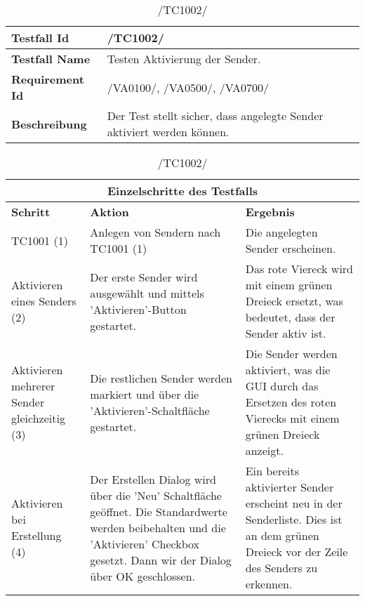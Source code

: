\begin{table}[h]
\caption{/TC1002/}
\label{tab:TC1002}
\begin{center}
\begin{tabular}{|p{3.5cm}|p{9cm}|}
\hline
\textbf{Testfall Id} & /TC1002/\\
\hline
\textbf{Testfall Name} & Testen Aktivierung der Sender.
\\
\hline
\textbf{Requirement Id} & /VA0100/, /VA0500/, /VA0700/\\
\hline
\textbf{Beschreibung} & Der Test stellt sicher, dass angelegte Sender aktiviert
werden können.
\\
\hline
\end{tabular}
\begin{tabular}{|p{2.5cm}|p{5cm}|p{4.55cm}|}
\multicolumn{3}{|c|}{\textbf{Einzelschritte des Testfalls}} \\
\hline
\textbf{Schritt} & \textbf{Aktion} & \textbf{Ergebnis}\\
\hline
TC1001 (1) & Anlegen von Sendern nach TC1001 (1) & Die angelegten Sender
 erscheinen.
\\
\hline
Aktivieren eines Senders (2) & Der erste Sender wird ausgewählt und mittels
 'Aktivieren'-Button gestartet. & Das rote Viereck wird mit einem grünen Dreieck
 ersetzt, was bedeutet, dass der Sender aktiv ist.
\\
\hline
Aktivieren mehrerer Sender gleichzeitig (3) & Die restlichen Sender werden
markiert und über die 'Aktivieren'-Schaltfläche gestartet. & Die Sender werden aktiviert,
was die GUI durch das Ersetzen des roten Vierecks mit einem grünen Dreieck
anzeigt.
\\
\hline
Aktivieren bei Erstellung (4) & Der Erstellen Dialog wird über die 'Neu'
 Schaltfläche geöffnet. Die Standardwerte werden beibehalten und die 'Aktivieren'
 Checkbox gesetzt. Dann wir der Dialog über OK geschlossen. & Ein bereits
 aktivierter Sender erscheint neu in der Senderliste. Dies ist an dem grünen
 Dreieck vor der Zeile des Senders zu erkennen.
\\
\hline
\end{tabular}
\end{center}
\end{table}

